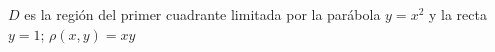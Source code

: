 \item $D$ es la región del primer cuadrante limitada por la parábola $y = x^2$ y la recta $y = 1$; \quad $\rho(x, y) = xy$
